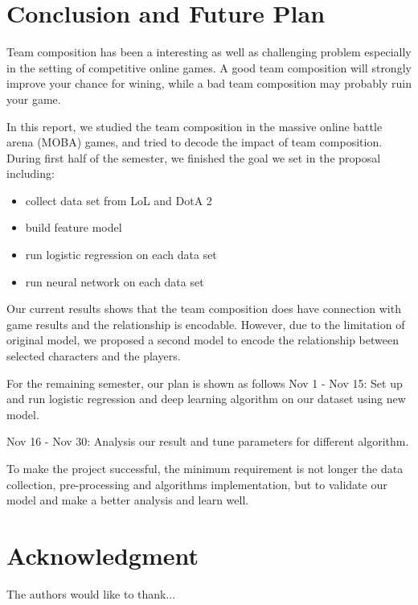 \documentclass[conference]{IEEEtran}
\begin{document}
\section{Conclusion and Future Plan}

Team composition has been a interesting as well as challenging problem especially in the setting of competitive online games. A good team composition will strongly improve your chance for wining, while a bad team composition may probably ruin your game.

In this report, we studied the team composition in the massive online battle arena (MOBA) games, and tried to decode the impact of team composition.
During first half of the semester, we finished the goal we set in the proposal including: 
\begin{itemize}
\item collect data set from LoL and DotA 2
\item build feature model 
\item run logistic regression on each data set
\item run neural network on each data set
\end{itemize}

Our current results shows that the team composition does have connection with game results and the relationship is encodable. However, due to the limitation of original model, we proposed a second model to encode the relationship between selected characters and the players.

For the remaining semester, our plan is shown as follows
Nov 1 - Nov 15: Set up and run logistic regression and deep learning algorithm on our dataset using new model.

Nov 16 - Nov 30: Analysis our result and tune parameters for different algorithm.

To make the project successful, the minimum requirement is not longer the data collection, pre-processing and algorithms implementation, but to validate our model and make a better analysis and learn well.







\section*{Acknowledgment}


The authors would like to thank...
\end{document}
